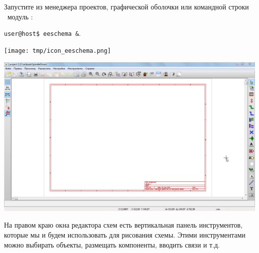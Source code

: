 
Запустите из менеджера проектов, графической оболочки или командной строки
\linux\ модуль \eeschema: 

\bigskip
\noindent\verb|user@host$ eeschema &|.

\bigskip
\noindent\texttt{[image: tmp/icon\_eeschema.png]}

\clearpage\noindent
\includegraphics[width=\textwidth]{kicad/ee15.png}

На правом краю окна редактора схем есть вертикальная панель инструментов,
которые мы и будем использовать для рисования схемы. Этими инструментами можно
выбирать объекты, размещать компоненты, вводить связи и т.д.

